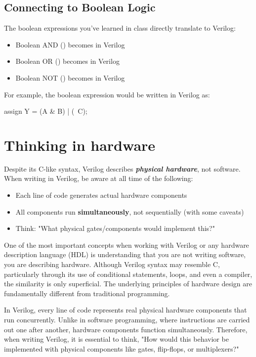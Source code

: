 \documentclass[12pt]{labmanual}
\begin{document}
\subsection{Connecting to Boolean Logic}
The boolean expressions you've learned in class directly translate to Verilog:
\begin{itemize}
  \item Boolean AND () becomes  in Verilog
  \item Boolean OR () becomes  in Verilog
  \item Boolean NOT () becomes  in Verilog
\end{itemize}
For example, the boolean expression  would be written in Verilog as:
\begin{codeblock}[language=verilog]
assign Y = (A & B) | (~C);
\end{codeblock}

\section{Thinking in hardware}
\label{sec:hw-thinking}
\begin{important}
    Despite its C-like syntax, Verilog describes \textbf{\textit{physical hardware}}, not software. When writing in Verilog, be aware at all time of the following: \begin{itemize} 
    \item Each line of code generates actual hardware components 
    \item All components run \textbf{simultaneously}, not sequentially (with some caveats)
    \item Think: "What physical gates/components would implement this?" 
    \end{itemize}
\end{important}

One of the most important concepts when working with Verilog or any hardware description language (HDL) is understanding that you are not writing software, you are describing hardware. Although Verilog syntax may resemble C, particularly through its use of conditional statements, loops, and even a compiler, the similarity is only superficial. The underlying principles of hardware design are fundamentally different from traditional programming.

In Verilog, every line of code represents real physical hardware components that run concurrently. Unlike in software programming, where instructions are carried out one after another, hardware components function simultaneously. Therefore, when writing Verilog, it is essential to think, "How would this behavior be implemented with physical components like gates, flip-flops, or multiplexers?"
\end{document}

